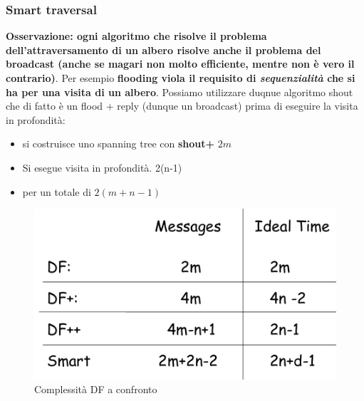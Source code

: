 \documentclass[12pt]{article}
\begin{document}
		\subsubsection{Smart traversal}
			\textbf{Osservazione: ogni algoritmo che risolve il problema dell'attraversamento di un albero risolve anche il problema del broadcast (anche se magari non molto efficiente, mentre non è vero il contrario)}. Per esempio \textbf{flooding viola il requisito di \textit{sequenzialità} che si ha per una visita di un albero}. 
			Possiamo utilizzare duqnue  algoritmo shout che di fatto è un flood + reply (dunque un broadcast) prima di eseguire la visita in profondità:
			\begin{itemize}
				\item si costruisce uno spanning tree con \textbf{shout+ }  $2m$
				\item Si esegue visita in profondità. 2(n-1)
				\item per un totale di $2(m+n-1)$
			\end{itemize}
			\begin{figure}[h!]
				\centering
				\includegraphics[scale=0.3]{img/conf.png}
				\caption{Complessità DF a confronto}
			\end{figure}
\end{document}
